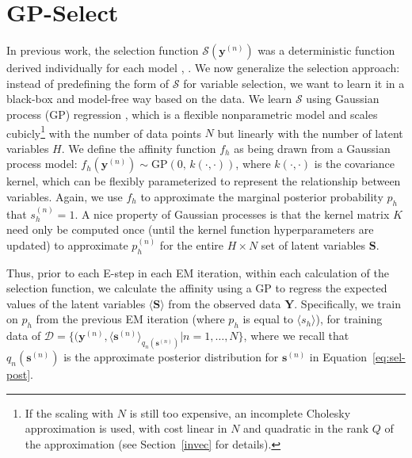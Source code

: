\documentclass[12pt]{article}
\renewcommand{\vec}[1]{{\mathbf{#1}}}
\newcommand{\Ss}{\mathcal{S}}
\begin{document}
\section{GP-Select}
\label{gp-select}
In previous work, the selection function $\mathcal{S}(\vec{y}^{(n)})$ 
was a deterministic function derived  individually for each model 
\citep[see e.g.][]{SheltonEtAl2011, SheltonEtAl2012, DaiLucke2012a, DaiLucke2012b,
BornscheinEtAl2013, SheikhEtAl2014, SheltonEtAl2015}, .
%
We now generalize the selection approach:
instead of predefining the form of $\Ss$ for variable selection, we want
to learn it in a black-box and model-free way based on the data.
%
We learn $\Ss$  using Gaussian process (GP) regression
\citep[e.g.][]{RasmussenGPbook}, which is a flexible nonparametric model 
and scales cubicly\footnote{If the scaling with $N$ is still too expensive, an incomplete Cholesky approximation is used, with cost linear in $N$ and quadratic in the rank $Q$ of the approximation (see Section~\ref{invec} for details).} with the number of data points $N$ but linearly with the number of latent variables $H$.  
We define the affinity function $f_h$ as being drawn from a Gaussian process model: 
$f_h(\vec{y}^{(n)}) \sim \text{GP}\left(0, \, k(\cdot,\cdot) \right)$, where $k(\cdot, \cdot)$ is the covariance kernel, 
which can be flexibly parameterized to represent the relationship between variables.
Again, we use $f_h$ to approximate the marginal posterior probability $p_h$ that $s_h^{(n)}=1$.
%
A nice property of Gaussian processes is that the kernel matrix $K$ need only be computed once (until the kernel function hyperparameters are updated) 
to approximate $p_h^{(n)}$ for the entire $H\times N$ set of latent variables $\vec{S}$. 

Thus, prior to each E-step in each EM iteration, within each calculation of the selection function, we calculate the affinity  using a GP to regress the expected values of the latent variables $\langle \vec{S} \rangle$ from the observed data $\vec{Y}$.  
Specifically, we train on $p_h$ from the previous EM iteration (where $p_h$ is equal to $\langle s_h \rangle$), for 
training data of 
$\mathcal{D} = \{ (\vec{y}^{(n)}, \langle\vec{s}^{(n)}\rangle_{q_n(\vec{s}^{(n)})} | n = 1,\dots, N \}$, 
where we recall that $q_{n}(\vec{s}^{(n)})$ is the approximate posterior distribution for $\vec{s}^{(n)}$ in Equation~\eqref{eq:sel-post}.
\end{document}
